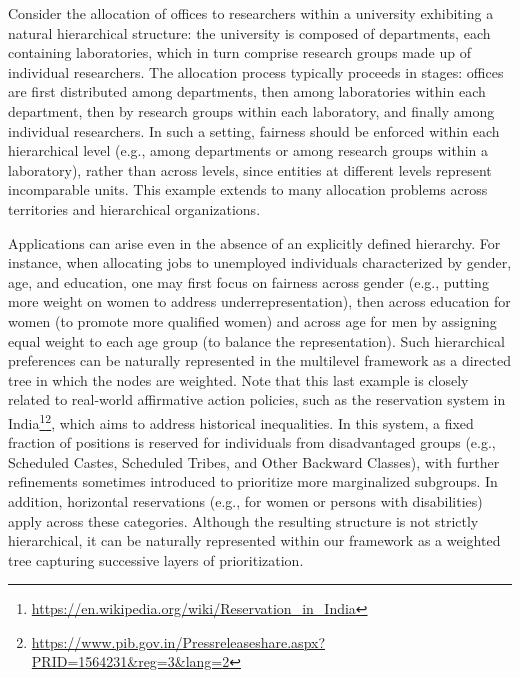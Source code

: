 \documentclass[]{article}
\begin{document}
Consider the allocation of offices to researchers within a university exhibiting a natural hierarchical structure: the university is composed of departments, each containing laboratories, which in turn comprise research groups made up of individual researchers. The allocation process typically proceeds in stages: offices are first distributed among departments, then among laboratories within each department, then by research groups within each laboratory, and finally among individual researchers. In such a setting, fairness should be enforced within each hierarchical level (e.g., among departments or among research groups within a laboratory), rather than across levels, since entities at different levels represent incomparable units. This example extends to many allocation problems across territories and hierarchical organizations. 

Applications can arise even in the absence of an explicitly defined hierarchy. For instance, when allocating jobs to unemployed individuals characterized by gender, age, and education, one may first focus on fairness across gender (e.g., putting more weight on women to address underrepresentation), then across education for women (to promote more qualified women) and across age for men by assigning equal weight to each age group (to balance the representation). Such hierarchical preferences can be naturally represented in the multilevel framework as a directed tree in which the nodes are weighted. Note that this last example is closely related to real-world affirmative action policies, such as the reservation system in India\footnote{\url{https://en.wikipedia.org/wiki/Reservation_in_India}}\footnote{\url{https://www.pib.gov.in/Pressreleaseshare.aspx?PRID=1564231&reg=3&lang=2}}, which aims to address historical inequalities. In this system, a fixed fraction of positions is reserved for individuals from disadvantaged groups (e.g., Scheduled Castes, Scheduled Tribes, and Other Backward Classes), with further refinements sometimes introduced to prioritize more marginalized subgroups. In addition, horizontal reservations (e.g., for women or persons with disabilities) apply across these categories. Although the resulting structure is not strictly hierarchical, it can be naturally represented within our framework as a weighted tree capturing successive layers of prioritization.
\end{document}
